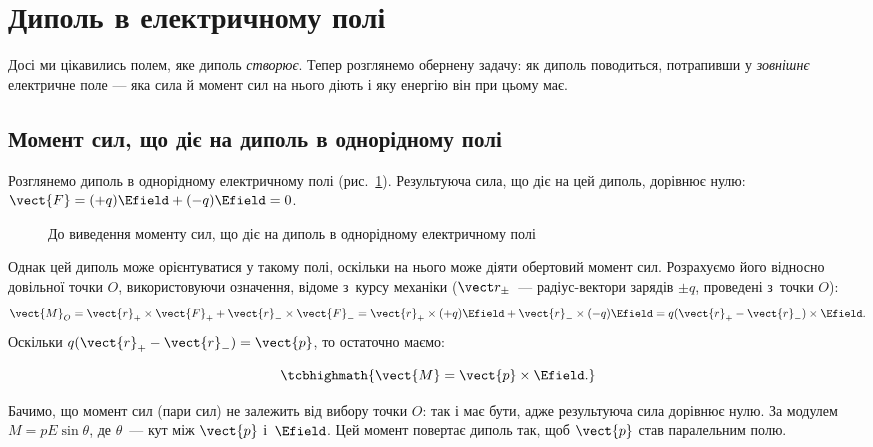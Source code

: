 \section{Диполь в електричному полі}\label{sec:DipoleEnergy}\hypertarget{dipole-in-field}{}

Досі ми цікавились полем, яке диполь \emph{створює}. Тепер розглянемо обернену задачу: як диполь поводиться, потрапивши у \emph{зовнішнє} електричне поле --- яка сила й момент сил на нього діють і яку енергію він при цьому має.


\subsection*{Момент сил, що діє на диполь в однорідному полі}


Розглянемо диполь в однорідному електричному полі (рис.~\ref{tikz:Momentum_on_dipole_in_yniform_field}). Результуюча сила, що діє на цей диполь, дорівнює
нулю: $\vect{F} = (+q)\Efield + (-q)\Efield = 0$.

\begin{figure}
	\centering
	\caption{До виведення моменту сил, що діє на диполь в однорідному електричному полі}
	\label{tikz:Momentum_on_dipole_in_yniform_field}
\end{figure}

Однак цей диполь може орієнтуватися у такому полі, оскільки на нього може діяти обертовий момент сил. Розрахуємо його відносно довільної точки $O$,
використовуючи означення, відоме з~курсу механіки ($\vect r_\pm$~--- радіус-вектори зарядів
$\pm q$, проведені з~точки $O$):
\begin{equation*}
	\vect{M}_O = \vect{r}_+ \times \vect{F}_+ +   \vect{r}_- \times \vect{F}_- = \vect{r}_+ \times (+q)\Efield +   \vect{r}_- \times (-q)\Efield =
	q(\vect{r}_+ - \vect{r}_-)\times \Efield.
\end{equation*}
Оскільки $q(\vect{r}_+ - \vect{r}_-) = \vect{p}$, то остаточно маємо:


\begin{equation*}
	\tcbhighmath{
		\vect{M} = \vect{p}\times\Efield.
	}
\end{equation*}


Бачимо, що момент сил (пари сил) не залежить від вибору точки $O$: так і має бути, адже
результуюча сила дорівнює нулю. За модулем $M = pE\sin\theta$, де $\theta$~--- кут між
$\vect{p}$ і~$\Efield$. Цей момент повертає диполь так, щоб $\vect{p}$ став паралельним
полю.


